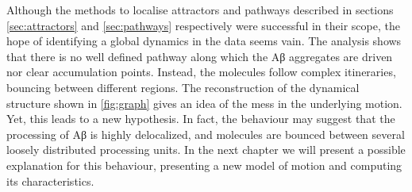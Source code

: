 
Although the methods to localise attractors and pathways described in sections \ref{sec:attractors} and \ref{sec:pathways} respectively were successful in their scope, the hope of identifying a global dynamics in the data seems vain. The analysis shows that there is no well defined pathway along which the Aβ aggregates are driven nor clear accumulation points. Instead, the molecules follow complex itineraries, bouncing between different regions. The reconstruction of the dynamical structure shown in \cref{fig:graph} gives an idea of the mess in the underlying motion. Yet, this leads to a new hypothesis. In fact, the behaviour may suggest that the processing of Aβ is highly delocalized, and molecules are bounced between several loosely distributed processing units. In the next chapter we will present a possible explanation for this behaviour, presenting a new model of motion and computing its characteristics.

